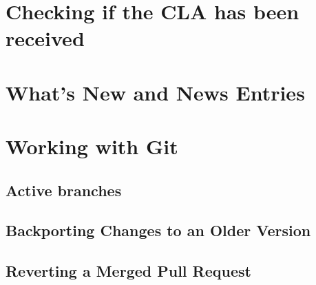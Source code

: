 \documentclass[]{book}
\begin{document}
\hypertarget{checking-if-the-cla-has-been-received-1}{%
\section{Checking if the CLA has been received}\label{checking-if-the-cla-has-been-received-1}}

\hypertarget{whats-new-and-news-entries-1}{%
\section{What's New and News Entries}\label{whats-new-and-news-entries-1}}

\hypertarget{working-with-git-1}{%
\section{Working with Git}\label{working-with-git-1}}

\hypertarget{active-branches-1}{%
\subsection{Active branches}\label{active-branches-1}}

\hypertarget{backporting-changes-to-an-older-version-1}{%
\subsection{Backporting Changes to an Older Version}\label{backporting-changes-to-an-older-version-1}}

\hypertarget{reverting-a-merged-pull-request-1}{%
\subsection{Reverting a Merged Pull Request}\label{reverting-a-merged-pull-request-1}}


\end{document}

